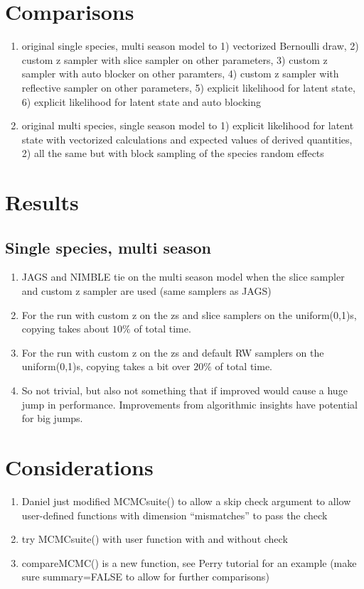 \documentclass[12pt]{article}
\begin{document}
\section{Comparisons}
\begin{enumerate}
\item original single species, multi season model to 1) vectorized
  Bernoulli draw, 2) custom z sampler with slice sampler on other
  parameters, 3) custom z sampler with auto blocker on other
  paramters, 4) custom z sampler with reflective sampler on other
  parameters, 5) explicit likelihood for latent state, 6) explicit
  likelihood for latent state and auto blocking
\item original multi species, single season model to 1) explicit
  likelihood for latent state with vectorized calculations and
  expected values of derived quantities, 2) all the same but with
  block sampling of the species random effects
\end{enumerate}

\section{Results}
\subsection{Single species, multi season}
\begin{enumerate}
\item JAGS and NIMBLE tie on the multi season model when the slice
  sampler and custom z sampler are used (same samplers as JAGS)
\item For the run with custom z on the zs and slice samplers on the
  uniform(0,1)s, copying takes about $10\%$ of total time.
\item For the run with custom z on the zs and default RW samplers on
  the uniform(0,1)s, copying takes a bit over $20\%$ of total time.
\item So not trivial, but also not something that if improved would
  cause a huge jump in performance.  Improvements from algorithmic
  insights have potential for big jumps.
\end{enumerate}

\section{Considerations}
\begin{enumerate}
\item Daniel just modified MCMCsuite() to allow a skip check argument
  to allow user-defined functions with dimension ``mismatches'' to
  pass the check \checkmark
\item try MCMCsuite() with user function with and without check
\item compareMCMC() is a new function, see Perry tutorial for an
  example (make sure summary=FALSE to allow for further comparisons)
\end{enumerate}
\end{document}
